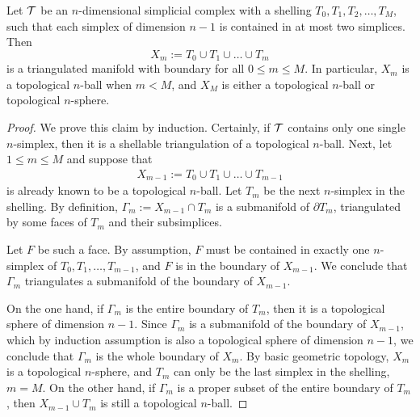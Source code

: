 \documentclass[10pt,a4paper]{article}
\begin{document}
\begin{lemma}\label{lemma:shell_triang_man}
    Let ${\mathcal T}$ be an $n$-dimensional simplicial complex 
    with a shelling $T_{0}, T_{1}, T_{2}, \dots, T_{M}$,
    such that each simplex of dimension $n-1$ is contained in at most two simplices. 
    Then
    $$
        X_{m} := T_{0} \cup T_{1} \cup \dots \cup T_{m}
    $$ 
    is a triangulated manifold with boundary for all $0 \leq m \leq M$.
    In particular, $X_{m}$ is a topological $n$-ball when $m < M$, 
    and 
    $X_{M}$ is either a topological $n$-ball or topological $n$-sphere. 
\end{lemma}
\begin{proof}  
    We prove this claim by induction. 
    Certainly, if ${\mathcal T}$ contains only one single $n$-simplex, then it is a shellable triangulation of a topological $n$-ball. 
    Next, let $1 \leq m \leq M$ and suppose that
    \begin{align*}
        X_{m-1} := T_{0} \cup T_{1} \cup \dots \cup T_{m-1}
    \end{align*}
    is already known to be a topological $n$-ball. Let $T_{m}$ be the next $n$-simplex in the shelling.
    By definition, $\Gamma_{m} := X_{m-1} \cap T_{m}$ is a submanifold of $\partial T_{m}$,
    triangulated by some faces of $T_{m}$ and their subsimplices. 
    
    Let $F$ be such a face. 
    By assumption, $F$ must be contained in exactly one $n$-simplex of $T_{0}, T_{1}, \dots, T_{m-1}$,
    and $F$ is in the boundary of $X_{m-1}$. 
    We conclude that $\Gamma_{m}$ triangulates a submanifold of the boundary of $X_{m-1}$.
    
    On the one hand, if $\Gamma_{m}$ is the entire boundary of $T_{m}$, then it is a topological sphere of dimension $n-1$. 
    Since $\Gamma_{m}$ is a submanifold of the boundary of $X_{m-1}$, which by induction assumption is also a topological sphere of dimension $n-1$,
    we conclude that $\Gamma_{m}$ is the whole boundary of $X_{m}$.
    By basic geometric topology, $X_{m}$ is a topological $n$-sphere, and $T_{m}$ can only be the last simplex in the shelling, $m=M$.
    On the other hand, 
    if $\Gamma_{m}$ is a proper subset of the entire boundary of $T_{m}$, 
    then $X_{m-1} \cup T_{m}$ is still a topological $n$-ball.
\end{proof}
\end{document}
